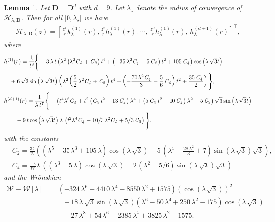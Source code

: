 \documentclass[11pt,a4paper,english,reqno]{amsart}
\theoremstyle{plain}
\newtheorem{lemma}[definition]{Lemma}
\newcommand{\1}{\mathbbm{1}}
\begin{document}
\begin{lemma}\label{lem:d=9case}
Let $\mathbf{D} = \mathbf{D}^{d}$ with $d = 9$. Let $\lambda_\star$ denote the radius of convergence of $\overline{\mathcal{H}_{\lambda, \mathbf{D}}}$. Then for all $[0, \lambda_\star[$ we have
\begin{align}
    \overline{\mathcal{H}_{\lambda, \mathbf{D}}}(z)  = \left[
\frac{z^{1}}{r}h_{ \lambda}^{(1)}(r),\frac{z^{2}}{r}h_{ \lambda}^{(1)}(r),\, \cdots ,\,\frac{z^{d}}{r}h_{ \lambda}^{(1)}(r),\, h^{(d+1)}_{\lambda}(r) \right]^\top,
\end{align}
where
\begin{align*}
& h^{(1)}(r) = \frac {1}{{t}^{8}} \Bigg\{ -3\,\lambda\,t \left( {\lambda}^{2} \left( {\lambda}^{2}{\it C_4}+{\it C_2} \right) {t}^{4}+ \left( -35\,{\lambda}^{2}{\it C_4}-5\,{\it C_2} \right) {t}^{2} +105\,{\it C_4} \right) \cos \left( \lambda\, \sqrt{3}t \right)\\
&\quad +6\, \sqrt{3}\sin \left( \lambda\, \sqrt{3}t \right)  \left( {\lambda}^{2} \left( \frac{5}{2}\,{\lambda}^{2}{\it C_4}+{\it C_2} \right) {t}^{4}+ \left( -{\frac {70\,{\lambda}^{2}{\it C_4}}{3}}-\frac{5}{6}\,{\it C_2} \right) {t}^{2}+{\frac {35\,{\it C_4}}{2}} \right)  \Bigg\} ,\\
&h^{(d+1)}(r)= \frac {1}{\lambda\,{t}^{7}} \Bigg\{ - \left( {t}^{4}{\lambda}^{6}{\it C_4}+{t}^{2} \left( {\it C_2}\,{t}^{2}-13\,{\it C_4} \right) {\lambda}^{4}+ \left( 5\,{\it C_2}\,{t}^{2}+10\,{\it C_4} \right) {\lambda}^{2}
\mbox{}-5\,{\it C_2} \right)  \sqrt{3}\sin \left( \lambda\, \sqrt{3}t \right) \\
&\qquad-9\,t\cos \left( \lambda\, \sqrt{3}t \right) \lambda\, \left( {t}^{2}{\lambda}^{4}{\it C_4}-10/3\,{\lambda}^{2}{\it C_4}+5/3\,{\it C_2} \right)  \Bigg\},
\end{align*}
with the constants
\begin{align*}
&C_2 = \frac{3\lambda}{ \mathcal{W}} \left(  \left( {\lambda}^{5}-35\,{\lambda}^{3}+105\,\lambda \right) \cos \left( \lambda\, \sqrt{3} \right) -5\, \left( {\lambda}^{4}-{\frac {28\,{\lambda}^{2}}{3}}+7 \right) \sin \left( \lambda\, \sqrt{3} \right)  \sqrt{3}\right) ,\\
&C_4 =  \frac{-3 }{ \mathcal{W}}\lambda\, \left(  \left( {\lambda}^{3}-5\,\lambda \right) \cos \left( \lambda\, \sqrt{3} \right) -2\, \left( {\lambda}^{2}-5/6 \right) \sin \left( \lambda\, \sqrt{3} \right)  \sqrt{3}  \right)
\end{align*}
and the Wr\"{o}nskian
\begin{align*}
\mathcal{W}\equiv \mathcal{W}[\lambda] &= \left( -324\,{\lambda}^{6}+4410\,{\lambda}^{4}-8550\,{\lambda}^{2}+1575 \right)  \left( \cos \left( \lambda\, \sqrt{3} \right)  \right) ^{2}\\
&\qquad-18\,\lambda\, \sqrt{3}\sin \left( \lambda\, \sqrt{3} \right)  \left( {\lambda}^{6}-50\,{\lambda}^{4}+250\,{\lambda}^{2}-175 \right) \cos \left( \lambda\, \sqrt{3} \right) \\
&\qquad+27\,{\lambda}^{8}+54\,{\lambda}^{6}-2385\,{\lambda}^{4}+3825\,{\lambda}^{2}-1575.
\end{align*}
\end{lemma}
\end{document}
